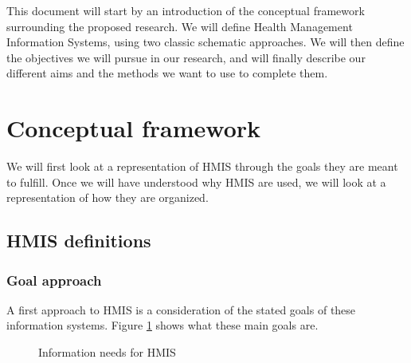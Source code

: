 \documentclass[a4paper,11pt,draft,twoside]{article}
\begin{document}
This document will start by an introduction of the conceptual framework surrounding the proposed research. We will define Health Management Information Systems, using two classic schematic approaches. We will then define the objectives we will pursue in our research, and will finally describe our different aims and the methods we want to use to complete them.


\section{Conceptual framework}

We will first look at a representation of HMIS through the goals they are meant to fulfill. Once we will have understood why HMIS are used, we will look at a representation of how they are organized.

    \subsection{HMIS definitions}
        \subsubsection{Goal approach}
        \label{sec_goal}

A first approach to HMIS is a consideration of the stated goals of these information systems. Figure \ref{HMISGoals} shows what these main goals are.
\begin{figure}[htp]
\centering
{}
\caption{Information needs for HMIS}
\label{HMISGoals}
\end{figure}
\end{document}
